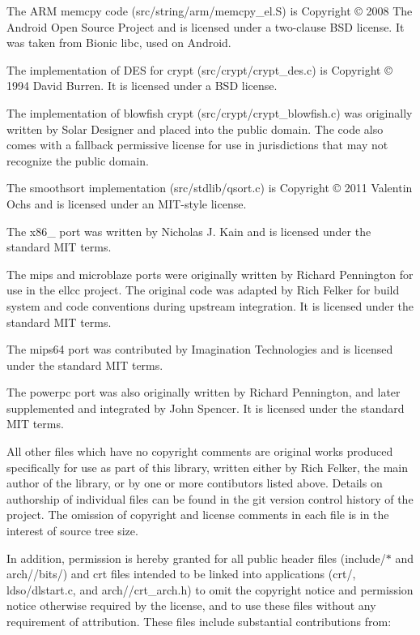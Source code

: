 The ARM memcpy code (src/string/arm/memcpy\+\_\+el.\+S) is Copyright © 2008 The Android Open Source Project and is licensed under a two-\/clause BSD license. It was taken from Bionic libc, used on Android.

The implementation of DES for crypt (src/crypt/crypt\+\_\+des.\+c) is Copyright © 1994 David Burren. It is licensed under a BSD license.

The implementation of blowfish crypt (src/crypt/crypt\+\_\+blowfish.\+c) was originally written by Solar Designer and placed into the public domain. The code also comes with a fallback permissive license for use in jurisdictions that may not recognize the public domain.

The smoothsort implementation (src/stdlib/qsort.\+c) is Copyright © 2011 Valentin Ochs and is licensed under an MIT-\/style license.

The x86\+\_ port was written by Nicholas J. Kain and is licensed under the standard MIT terms.

The mips and microblaze ports were originally written by Richard Pennington for use in the ellcc project. The original code was adapted by Rich Felker for build system and code conventions during upstream integration. It is licensed under the standard MIT terms.

The mips64 port was contributed by Imagination Technologies and is licensed under the standard MIT terms.

The powerpc port was also originally written by Richard Pennington, and later supplemented and integrated by John Spencer. It is licensed under the standard MIT terms.

All other files which have no copyright comments are original works produced specifically for use as part of this library, written either by Rich Felker, the main author of the library, or by one or more contibutors listed above. Details on authorship of individual files can be found in the git version control history of the project. The omission of copyright and license comments in each file is in the interest of source tree size.

In addition, permission is hereby granted for all public header files (include/\texorpdfstring{$\ast$}{*} and arch//bits/) and crt files intended to be linked into applications (crt/, ldso/dlstart.\+c, and arch//crt\+\_\+arch.h) to omit the copyright notice and permission notice otherwise required by the license, and to use these files without any requirement of attribution. These files include substantial contributions from\+:


